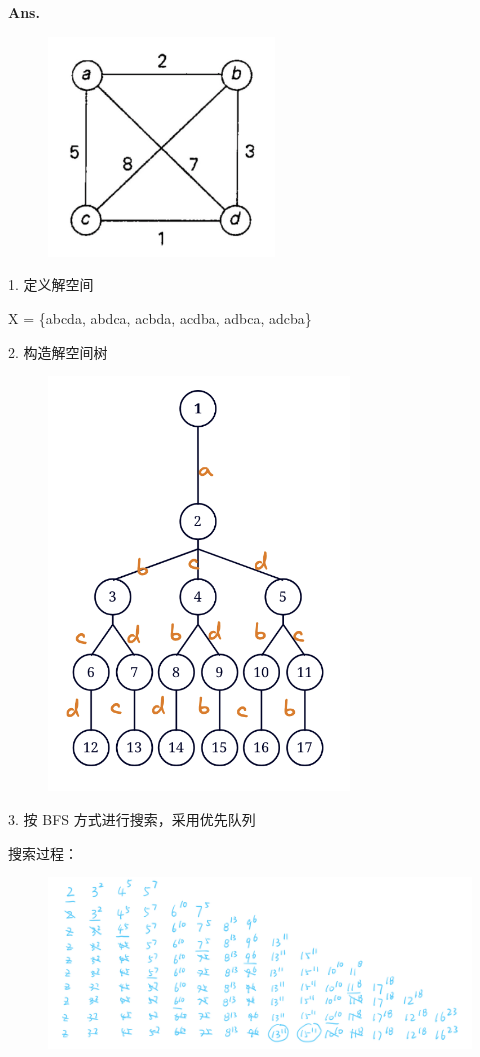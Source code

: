 \documentclass[12pt, a4paper, UTF8, fontset=windows]{ctexbook}
\newenvironment{solution}{\par\noindent\textbf{Ans.}}{\par}
\begin{document}
\begin{solution}
    \begin{figure}[htb]
        \centering
        \includegraphics[width=6cm]{../../src/images/hw3-Q4.png}
    \end{figure}

    1. 定义解空间

    X = \{abcda, abdca, acbda, acdba, adbca, adcba\}

    2. 构造解空间树

    \begin{figure}[h]
        \centering
        \includegraphics[width=8cm]{../../src/images/hw3-Q4-tree.png}
    \end{figure}

    \newpage

    3. 按 BFS 方式进行搜索，采用优先队列 

    搜索过程：
    
    \begin{figure}[h]
        \centering
        \includegraphics[width=15cm]{../../src/images/hw3-Q4-solution.jpg}
    \end{figure}


\end{solution}
\end{document}
